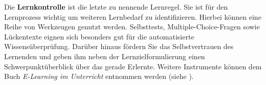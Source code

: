 Die \textbf{Lernkontrolle} ist die letzte zu nennende Lernregel. \cite[S. 15]{Vontobel.2006} Sie ist für den Lernprozess wichtig um weiteren Lernbedarf zu identifizieren. Hierbei können eine Reihe von Werkzeugen genutzt werden. Selbsttests, Multiple-Choice-Fragen sowie Lückentexte eignen sich besonders gut für die automatisierte Wissensüberprüfung. Darüber hinaus fördern Sie das Selbstvertrauen des Lernenden und geben ihm neben der Lernzielformulierung einen Schwerpunktüberblick über das gerade Erlernte. \cite[S. 72f.]{Drummer.2011} Weitere Instrumente können dem Buch \emph{E-Learning im Unterricht} entnommen werden (siehe \cite{Drummer.2011}).   %


